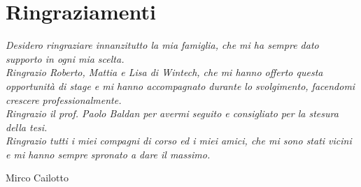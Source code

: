 \documentclass[Tesi.tex]{subfiles}
\begin{document}
\clearpage\thispagestyle{empty}




\chapter*{Ringraziamenti}

\textit{{\color{color_dedica}Desidero ringraziare innanzitutto la mia famiglia, che mi ha sempre dato supporto in ogni mia scelta. }}\\

\textit{{\color{color_dedica}Ringrazio Roberto, Mattia e Lisa di Wintech, che mi hanno offerto questa opportunità di stage e mi hanno accompagnato durante lo svolgimento, facendomi crescere professionalmente. }}\\

\textit{{\color{color_dedica}Ringrazio il prof. Paolo Baldan per avermi seguito e consigliato per la stesura della tesi. }}\\

\textit{{\color{color_dedica}Ringrazio tutti i miei compagni di corso ed i miei amici, che mi sono stati vicini e mi hanno sempre spronato a dare il massimo.}}

\begin{flushright}
	Mirco Cailotto
\end{flushright}

\clearpage
\end{document}
